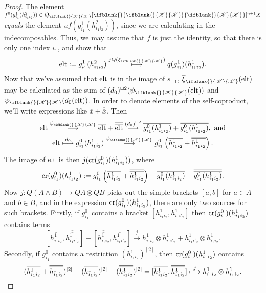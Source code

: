 \documentclass[10pt]{article}
\newcommand{\LL}[1]{\ifblank{#1}{\scrK}{\scrK^{#1}}}
\newcommand{\Fr}[2][]{\ifblank{#1}{#2}{#2_{#1}}}
\renewcommand{\Q}{Q}
\begin{document}
\begin{Grothendieck Multiplicativity}
\begin{proof}
The element $f^0(g^1_{i_1}(h^2_{i_1i_2}))\in \Q_{\LL{}}[\Fr{\LL{}}]^{n+1}X$ \emph{equals} the element $uf(g^1_{i_1}(h^2_{i_1i_2}))$, since we are calculating in the indecomposables. Thus, we may assume that $f$ is just the identity, so that there is only one index $i_1$, and show that
\[\textup{elt}:=g^1_{i_1}(h^2_{i_1i_2})\overset{j\circ Q(\xi_{\LL{}})}{\mapsto} q(g^1_{i_1})(h^1_{i_1i_2}).\]
Now that we've assumed that $\textup{elt}$ is in the image of $s_{-1}$, $\overline{\xi}_{\LL{}}(\textup{elt})$ may be calculated as the sum of $(d_0)^{\sqcup 2}(\psi_{\LL{}}(\textup{elt}))$ and $\psi_{\LL{}}(d_0(\textup{elt}))$. In order to denote elements of the self-coproduct, we'll write expressions like $\overline{x}+\overline{\overline{x}}$. Then
\begin{gather*}
\textup{elt}\overset{\psi_{\LL{}}}{\mapsto}\overline{\textup{elt}}+\overline{\overline{\textup{elt}}} \overset{(d_0)^{\sqcup 2}}{\to}\overline{g^0_{i_1}(h^1_{i_1i_2})}+ \overline{\overline{g^0_{i_1}(h^1_{i_1i_2})}},\textup{ and}\\
\textup{elt}\overset{d_0}{\mapsto} g^0_{i_1}(h^1_{i_1i_2})\overset{\psi_{\LL{}}}{\to} g^0_{i_1}\left(\overline{h^1_{i_1i_2}}+ \overline{\overline{h^1_{i_1i_2}}}\right).
\end{gather*}
The image of $\textup{elt}$ is then $j(\textup{cr}(g^0_{i_1})(h^1_{i_1i_2}))$, where
\[\textup{cr}(g^0_{i_1})(h^1_{i_1i_2}):=
g^0_{i_1}\left(\overline{h^1_{i_1i_2}} +\overline{\overline{h^1_{i_1i_2}}}\right)
-\overline{g^0_{i_1}(h^1_{i_1i_2})}- \overline{\overline{g^0_{i_1}(h^1_{i_1i_2})}}.\]
Now $j:Q(A\wedge B)\to QA\otimes QB$ picks out the simple brackets $[a,b]$ for $a\in A$ and $b\in B$, and in the expression $\textup{cr}(g^0_{i_1})(h^1_{i_1i_2})$, there are only two sources for such brackets. Firstly, if $g^0_{i_1}$ contains a bracket $[h^1_{i_1i_2},h^1_{i_1i'_2}]$ then $\textup{cr}(g^0_{i_1})(h^1_{i_1i_2})$ contains terms
\[[\overline{h^1_{i_1i_2}},\overline{\overline{h^1_{i_1i'_2}}}]+ [\overline{\overline{h^1_{i_1i_2}}},\overline{h^1_{i_1i'_2}}]\overset{j}{\mapsto}h^1_{i_1i_2}\otimes h^1_{i_1i'_2}+h^1_{i_1i'_2}\otimes h^1_{i_1i_2}.\]
Secondly, if $g^0_{i_1}$ contains a restriction $(h^1_{i_1i_2})^{[2]}$, then $\textup{cr}(g^0_{i_1})(h^1_{i_1i_2})$ contains
\[(\overline{h^1_{i_1i_2}}+\overline{\overline{h^1_{i_1i_2}}})^{[2]}-
(\overline{h^1_{i_1i_2}})^{[2]}
-(\overline{\overline{h^1_{i_1i_2}}})^{[2]}
=[\overline{h^1_{i_1i_2}},\overline{\overline{h^1_{i_1i_2}}}]\overset{j}{\mapsto}h^1_{i_1i_2}\otimes h^1_{i_1i_2}.\qedhere\]
\end{proof}


\end{Grothendieck Multiplicativity}
\end{document}
